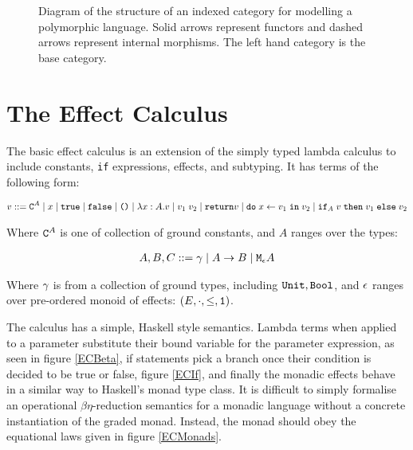 \documentclass{Report}
\begin{document}
\begin{figure}[h!]
    \caption{Diagram of the structure of an indexed category for modelling a polymorphic language. Solid arrows represent functors and dashed arrows represent internal morphisms. The left hand category is the base category. 
    }
    \label{IndexDiagram}
\end{figure}


\section{The Effect Calculus}

The basic effect calculus is an extension of the simply typed lambda calculus to include constants, \texttt{if} expressions, effects, and subtyping. It has terms of the following form:

\begin{align}
    v ::= \texttt{C}^{A} \mid x\mid \texttt{true} \mid\texttt{false} \mid\texttt{()}\mid\lambda x : A. v\mid v_1\; v_2\mid\texttt{return} v\mid\texttt{do}\; x \leftarrow v_1 \;\texttt{in}\; v_2\mid\texttt{if}_{A}\; v\; \texttt{then}\; v_1 \;\texttt{else} \; v_2 
\end{align}

Where $\texttt{C}^{A}$ is one of collection of ground constants, and $A$ ranges over the types:

\begin{align}
    A, B, C ::= \gamma\mid A\rightarrow B \mid\texttt{M}_{\epsilon}{A}
\end{align}

Where $\gamma$ is from a collection of ground types, including $\texttt{Unit}, \texttt{Bool}$, and $\epsilon$ ranges over pre-ordered monoid of effects: $(E, \cdot, \leq, \texttt{1})$.

The calculus has a simple, Haskell style semantics. Lambda terms when applied to a parameter substitute their bound variable for the parameter expression, as seen in figure \ref{ECBeta}, if statements pick a branch once their condition is decided to be true or false, figure \ref{ECIf}, and finally the monadic effects behave in a similar way to Haskell's monad type class. It is difficult to simply formalise an operational $\beta\eta$-reduction semantics for a monadic language without a concrete instantiation of the graded monad. Instead, the monad should obey the equational laws given in figure \ref{ECMonads}.
\end{document}
